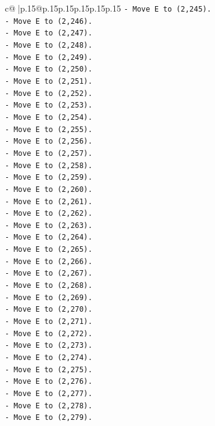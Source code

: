 \documentclass{article}
\begin{document}
{\begin{supertabular}{c@{$\;$}|p{.15\linewidth}@{}p{.15\linewidth}p{.15\linewidth}p{.15\linewidth}p{.15\linewidth}p{.15\linewidth}}
{{{\texttt{{-} Move E to (2,245).} \\
\texttt{{-} Move E to (2,246).} \\
\texttt{{-} Move E to (2,247).} \\
\texttt{{-} Move E to (2,248).} \\
\texttt{{-} Move E to (2,249).} \\
\texttt{{-} Move E to (2,250).} \\
\texttt{{-} Move E to (2,251).} \\
\texttt{{-} Move E to (2,252).} \\
\texttt{{-} Move E to (2,253).} \\
\texttt{{-} Move E to (2,254).} \\
\texttt{{-} Move E to (2,255).} \\
\texttt{{-} Move E to (2,256).} \\
\texttt{{-} Move E to (2,257).} \\
\texttt{{-} Move E to (2,258).} \\
\texttt{{-} Move E to (2,259).} \\
\texttt{{-} Move E to (2,260).} \\
\texttt{{-} Move E to (2,261).} \\
\texttt{{-} Move E to (2,262).} \\
\texttt{{-} Move E to (2,263).} \\
\texttt{{-} Move E to (2,264).} \\
\texttt{{-} Move E to (2,265).} \\
\texttt{{-} Move E to (2,266).} \\
\texttt{{-} Move E to (2,267).} \\
\texttt{{-} Move E to (2,268).} \\
\texttt{{-} Move E to (2,269).} \\
\texttt{{-} Move E to (2,270).} \\
\texttt{{-} Move E to (2,271).} \\
\texttt{{-} Move E to (2,272).} \\
\texttt{{-} Move E to (2,273).} \\
\texttt{{-} Move E to (2,274).} \\
\texttt{{-} Move E to (2,275).} \\
\texttt{{-} Move E to (2,276).} \\
\texttt{{-} Move E to (2,277).} \\
\texttt{{-} Move E to (2,278).} \\
\texttt{{-} Move E to (2,279).} \\
}}}
\end{supertabular}}
\end{document}
